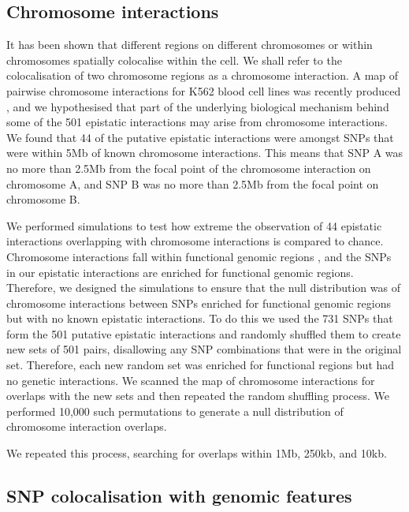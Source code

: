 \documentclass{article}
\begin{document}
\subsection{Chromosome interactions}

It has been shown \cite{Lieberman-Aiden2009} that different regions on different chromosomes or within chromosomes spatially colocalise within the cell. We shall refer to the colocalisation of two chromosome regions as a chromosome interaction. A map of pairwise chromosome interactions for K562 blood cell lines was recently produced \cite{Lan2012}, and we hypothesised that part of the underlying biological mechanism behind some of the 501 epistatic interactions may arise from chromosome interactions. We found that 44 of the putative epistatic interactions were amongst SNPs that were within 5Mb of known chromosome interactions. This means that SNP A was no more than 2.5Mb from the focal point of the chromosome interaction on chromosome A, and SNP B was no more than 2.5Mb from the focal point on chromosome B.

We performed simulations to test how extreme the observation of 44 epistatic interactions overlapping with chromosome interactions is compared to chance. Chromosome interactions fall within functional genomic regions \cite{Lieberman-Aiden2009, Lan2012}, and the SNPs in our epistatic interactions are enriched for functional genomic regions. Therefore, we designed the simulations to ensure that the null distribution was of chromosome interactions between SNPs enriched for functional genomic regions but with no known epistatic interactions. To do this we used the 731 SNPs that form the 501 putative epistatic interactions and randomly shuffled them to create new sets of 501 pairs, disallowing any SNP combinations that were in the original set. Therefore, each new random set was enriched for functional regions but had no genetic interactions. We scanned the map of chromosome interactions for overlaps with the new sets and then repeated the random shuffling process. We performed 10,000 such permutations to generate a null distribution of chromosome interaction overlaps.

We repeated this process, searching for overlaps within 1Mb, 250kb, and 10kb.


\subsection{SNP colocalisation with genomic features}
\label{sub:snp_colocalisation_with_genomic_features}
\end{document}
